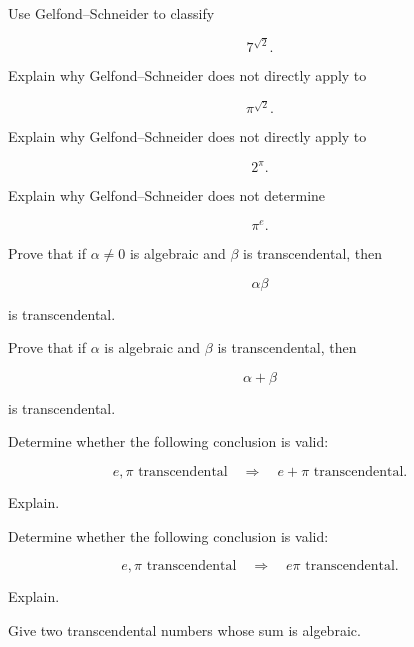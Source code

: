 \begin{exercise}[1]
Use Gelfond--Schneider to classify

\[ 7^{\sqrt2}. \]
\end{exercise}

\begin{exercise}[2]
Explain why Gelfond--Schneider does not directly apply to

\[ \pi^{\sqrt2}. \]
\end{exercise}

\begin{exercise}[2]
Explain why Gelfond--Schneider does not directly apply to

\[ 2^\pi. \]
\end{exercise}

\begin{exercise}[2]
Explain why Gelfond--Schneider does not determine

\[ \pi^e. \]
\end{exercise}

\begin{exercise}[2]
Prove that if \(\alpha\neq0\) is algebraic and \(\beta\) is transcendental,
then

\[ \alpha\beta \]

is transcendental.
\end{exercise}

\begin{exercise}[2]
Prove that if \(\alpha\) is algebraic and \(\beta\) is transcendental, then

\[ \alpha+\beta \]

is transcendental.
\end{exercise}

\begin{exercise}[1]
Determine whether the following conclusion is valid:

\[
e,\pi\text{ transcendental}
\quad\Longrightarrow\quad
e+\pi\text{ transcendental}.
\]

Explain.
\end{exercise}

\begin{exercise}[1]
Determine whether the following conclusion is valid:

\[
e,\pi\text{ transcendental}
\quad\Longrightarrow\quad
e\pi\text{ transcendental}.
\]

Explain.
\end{exercise}

\begin{exercise}[2]
Give two transcendental numbers whose sum is algebraic.
\end{exercise}

